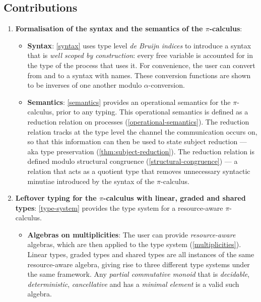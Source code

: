 \documentclass[sigplan,10pt,anonymous,review]{acmart}
\theoremstyle{definition}
\newcommand{\picalc}{$\pi$-calculus}
\begin{document}
\subsection{Contributions}
\begin{enumerate}
\item \textbf{Formalisation of the syntax and the semantics of the \picalc{}}:
 \begin{itemize}
   \item \textbf{Syntax}: \autoref{syntax} uses type level \emph{de Bruijn indices} \cite{deBruijn1972, Dybjer1994} to introduce a syntax that is \emph{well scoped by construction}: every free variable is accounted for in the type of the process that uses it.
     For convenience, the user can convert from and to a syntax with names.
     These conversion functions are shown to be inverses of one another modulo $\alpha$-conversion.
   
   \item \textbf{Semantics}: \autoref{semantics} provides an operational semantics for the \picalc{}, prior to any typing.
   This operational semantics is defined as a reduction relation on processes (\autoref{operational-semantics}).
   The reduction relation tracks at the type level the channel the communication occurs on, so that this information can then be used to state subject reduction --- aka type preservation (\autoref{thm:subject-reduction}).
   The reduction relation is defined modulo structural congruence (\autoref{structural-congruence}) --- a relation that acts as a quotient type that removes unnecessary syntactic minutiae introduced by the syntax of the \picalc{}.
 \end{itemize}
  
  \item \textbf{Leftover typing for the \picalc{} with linear, graded and shared types}:
  \autoref{type-system} provides the type system for a resource-aware \picalc{}.
  \begin{itemize}
    \item \textbf{Algebras on multiplicities}: The user can provide \emph{resource-aware} algebras, which are then applied to the type system (\autoref{multiplicities}).
    Linear types, graded types and shared types are all instances of the same resource-aware algebra, giving rise to three different type systems under the same framework.
    Any \emph{partial commutative monoid} that is \emph{decidable}, \emph{deterministic}, \emph{cancellative} and has a \emph{minimal element} is a valid such algebra.
    

\end{itemize}
\end{enumerate}
\end{document}

